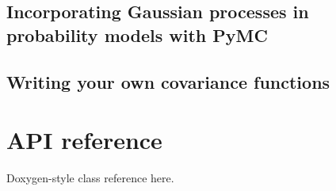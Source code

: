 \documentclass{manual}
\begin{document}


\section{Incorporating Gaussian processes in probability models with PyMC}\label{sec:PyMC} %


\section{Writing your own covariance functions}\label{sec:user_cov} %



\chapter{API reference}\label{cha:reference} 

Doxygen-style class reference here.
\end{document}
